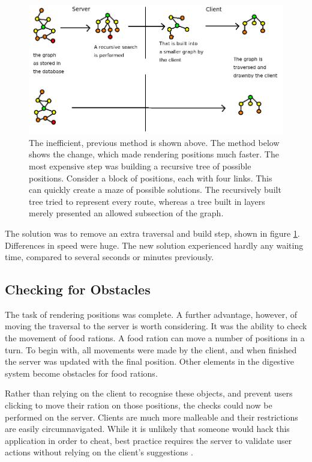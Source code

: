 \begin{figure}[h]
\centering
\includegraphics[width=5in]{Images/3/efficient-example}
\caption{The inefficient, previous method is shown above. The method below shows the change, which made rendering positions much faster. The most expensive step was building a recursive tree of possible positions. Consider a block of positions, each with four links. This can quickly create a maze of possible solutions. The recursively built tree tried to represent every route, whereas a tree built in layers merely presented an allowed subsection of the graph.}
\label{3_efficient}
\end{figure}

The solution was to remove an extra traversal and build step, shown in figure \ref{3_efficient}. Differences in speed were huge. The new solution experienced hardly any waiting time, compared to several seconds or minutes previously.

\subsection{Checking for Obstacles}
The task of rendering positions was complete. A further advantage, however, of moving the traversal to the server is worth considering. It was the ability to check the movement of food rations. A food ration can move a number of positions in a turn. To begin with, all movements were made by the client, and when finished the server was updated with the final position. Other elements in the digestive system become obstacles for food rations. 

Rather than relying on the client to recognise these objects, and prevent users clicking to move their ration on those positions, the checks could now be performed on the server. Clients are much more malleable and their restrictions are easily circumnavigated. While it is unlikely that someone would hack this application in order to cheat, best practice requires the server to validate user actions without relying on the client's suggestions \cite{APISecurity}.

